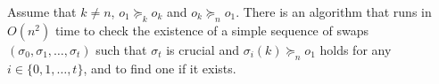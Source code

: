 
\begin{lemma}\label{lem_star-algorithm}
    Assume that $k\neq n$, $o_1 \succeq_k o_k$ and $o_k \succeq_n o_1$.
    There is an algorithm that runs in $O(n^2)$ time to check the existence of a simple sequence of swaps $(\sigma_0,\sigma_1,\dots,\sigma_t)$ such that $\sigma_t$ is crucial and $\sigma_i(k)\succeq_n o_1$ holds for any $i\in \{0,1,\dots, t\}$, and to find one if it exists.
\end{lemma}




